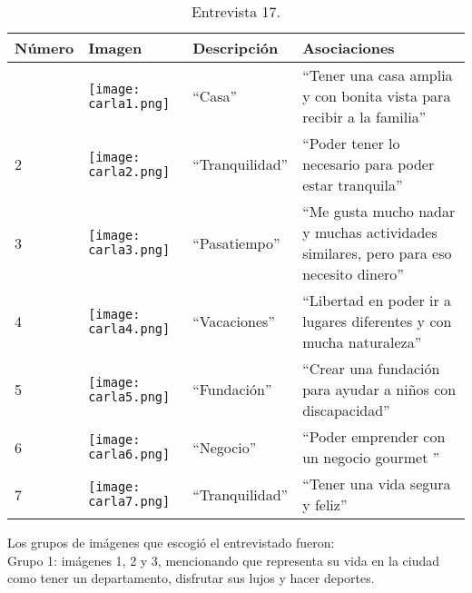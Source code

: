 \begin{table}[H]
	\centering
	\begin{tabular}{>{\centering\arraybackslash}m{1cm} >{\centering\arraybackslash}m{2cm} >{\arraybackslash}m{5cm}>{\arraybackslash}m{5cm}}
		\hline
		Número  & Imagen & Descripción & Asociaciones \\
		\hline \hline
		
		1 & \texttt{[image: carla1.png]} & ``Casa'' & ``Tener una casa amplia y con bonita vista para recibir a la familia'' \\
		\hline
		
		2 & \texttt{[image: carla2.png]} & ``Tranquilidad'' & ``Poder tener lo necesario para poder estar tranquila'' \\
		\hline
		
		3 & \texttt{[image: carla3.png]} & ``Pasatiempo'' & ``Me gusta mucho nadar y muchas actividades similares, pero para eso necesito dinero'' \\
		\hline
		
		4 & \texttt{[image: carla4.png]} & ``Vacaciones'' & ``Libertad en poder ir a lugares diferentes y con mucha naturaleza'' \\
		\hline
		
		5 & \texttt{[image: carla5.png]} & ``Fundación'' & ``Crear una fundación para ayudar a niños con discapacidad'' \\
		\hline
		
		6 & \texttt{[image: carla6.png]} & ``Negocio'' & ``Poder emprender con un negocio gourmet '' \\
		\hline
		
		7 & \texttt{[image: carla7.png]} & ``Tranquilidad'' & ``Tener una vida segura y feliz'' \\
		\hline
		

		
	\end{tabular}
	\caption{Entrevista 17.}
	\label{tabla:carla}
\end{table}

Los grupos de imágenes que escogió el entrevistado fueron:\\

Grupo 1: imágenes 1, 2 y 3, mencionando que representa su vida en la ciudad como tener un departamento, disfrutar sus lujos y hacer deportes. \\

